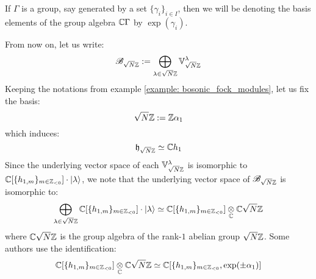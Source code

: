         \begin{convention}
            If $\Gamma$ is a group, say generated by a set $\{\gamma_i\}_{i \in I}$, then we will be denoting the basis elements of the group algebra $\mathbb{C}\Gamma$ by $\exp(\gamma_i)$.
        \end{convention}

        From now on, let us write:
            $$\mathscr{B}_{\sqrt{N}\mathbb{Z}} := \bigoplus_{\lambda \in \sqrt{N} \mathbb{Z}} \mathbb{V}_{\sqrt{N} \mathbb{Z}}^{\lambda}$$
        Keeping the notations from example \ref{example: bosonic_fock_modules}, let us fix the basis:
            $$\sqrt{N} \mathbb{Z} := \mathbb{Z} \alpha_1$$
        which induces:
            $$\mathfrak{h}_{\sqrt{N} \mathbb{Z}} \simeq \mathbb{C} h_1$$
        Since the underlying vector space of each $\mathbb{V}_{\sqrt{N} \mathbb{Z}}^{\lambda}$ is isomorphic to $\mathbb{C}[\{h_{1, m}\}_{m \in \mathbb{Z}_{< 0}}] \cdot \lvert {\lambda} \rangle$, we note that the underlying vector space of $\mathscr{B}_{\sqrt{N} \mathbb{Z}}$ is isomorphic to:
            $$\bigoplus_{\lambda \in \sqrt{N} \Z} \bbC[\{h_{1, m}\}_{m \in \Z_{< 0}}] \cdot \ket{\lambda} \cong \bbC[\{h_{1, m}\}_{m \in \Z_{< 0}}] \tensor_{\bbC} \bbC \sqrt{N} \Z$$
        where $\mathbb{C} \sqrt{N} \mathbb{Z}$ is the group algebra of the rank-$1$ abelian group $\sqrt{N} \mathbb{Z}$. Some authors use the identification:
            $$\bbC[\{h_{1, m}\}_{m \in \Z_{< 0}}] \tensor_{\bbC} \bbC \sqrt{N} \Z \cong \bbC[\{h_{1, m}\}_{m \in \Z_{< 0}}, \exp(\pm \alpha_1)]$$
        
